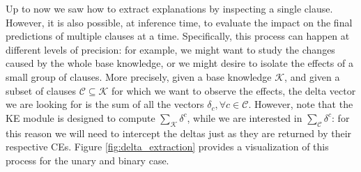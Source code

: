  Up to now we saw how to extract explanations by inspecting a single clause. However, it is also possible, at inference time, to evaluate the impact on the final predictions of multiple clauses at a time. Specifically, this process can happen at different levels of precision: for example, we might want to study the changes caused by the whole base knowledge, or we might desire to isolate the effects of a small group of clauses. More precisely, given a base knowledge $\mathcal{K}$, and given a subset of clauses $\mathcal{C} \subseteq \mathcal{K}$ for which we want to observe the effects, the delta vector we are looking for is the sum of all the vectors $\delta_c, \forall c \in \mathcal{C}$. However, note that the KE module is designed to compute $\sum_{\mathcal{K}}\delta^c$, while we are interested in $\sum_{\mathcal{C}}\delta^c$: for this reason we will need to intercept the deltas just as they are returned by their respective CEs. Figure \ref{fig:delta_extraction} provides a visualization of this process for the unary and binary case. 
